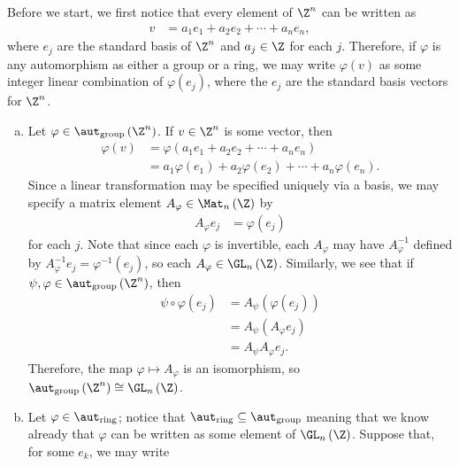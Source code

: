 \documentclass[10pt]{mypackage}
\begin{document}
\begin{solution}
  Before we start, we first notice that every element of $\Z^{n}$ can be written as
    \begin{align*}
      v &= a_1e_1 + a_2e_2 + \cdots + a_ne_n,
    \end{align*}
    where $e_j$ are the standard basis of $\Z^n$ and $a_j\in \Z$ for each $j$. Therefore, if $\varphi$ is any automorphism as either a group or a ring, we may write $\varphi(v)$ as some integer linear combination of $\varphi\left( e_j \right)$, where the $e_j$ are the standard basis vectors for $\Z^{n}$.
  \begin{enumerate}[(a)]
    \item Let $\varphi\in \aut_{\text{group}}\left( \Z^{n} \right)$. If $v\in \Z^{n}$ is some vector, then
      \begin{align*}
        \varphi\left( v \right) &= \varphi\left( a_1e_1 + a_2e_2 + \cdots + a_ne_n \right)\\
                                &= a_1\varphi\left( e_1 \right) + a_2\varphi\left( e_2 \right) + \cdots + a_n\varphi\left( e_n \right).
      \end{align*}
      Since a linear transformation may be specified uniquely via a basis, we may specify a matrix element $A_{\varphi}\in \Mat_{n}\left( \Z \right)$ by
      \begin{align*}
        A_{\varphi}e_j &= \varphi\left( e_j \right)
      \end{align*}
      for each $j$. Note that since each $\varphi$ is invertible, each $A_{\varphi}$ may have $A_{\varphi}^{-1}$ defined by $A_{\varphi}^{-1}e_j = \varphi^{-1}\left( e_j \right) $, so each $A_{\varphi}\in \GL_n\left( \Z \right)$. Similarly, we see that if $\psi,\varphi\in \aut_{\text{group}}\left( \Z^{n} \right)$, then
      \begin{align*}
        \psi\circ\varphi\left( e_j \right) &= A_{\psi}\left( \varphi\left( e_j \right) \right)\\
                                           &= A_{\psi}\left( A_{\varphi}e_j \right)\\
                                           &= A_{\psi}A_{\varphi}e_j.
      \end{align*}
      Therefore, the map $\varphi\mapsto A_{\varphi}$ is an isomorphism, so $\aut_{\text{group}}\left( \Z^{n} \right) \cong \GL_n\left( \Z \right)$.
    \item Let $\varphi\in \aut_{\text{ring}}$; notice that $\aut_{\text{ring}}\subseteq \aut_{\text{group}}$ meaning that we know already that $\varphi$ can be written as some element of $\GL_n\left( \Z \right)$. Suppose that, for some $e_k$, we may write

\end{enumerate}
\end{solution}
\end{document}
